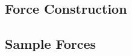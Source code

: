 

\subsection{Force Construction}
\label{subsec:force_construction}



\newpage

\subsection{Sample Forces}
\label{subsec:force_construction}



\newpage

